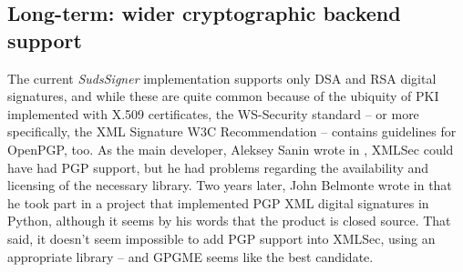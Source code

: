 \subsection{Long-term: wider cryptographic backend support}

The current \emph{SudsSigner} implementation supports only DSA and RSA digital signatures, and while these are quite common because of the ubiquity of PKI implemented with X.509 certificates, the WS\hyp{}Security standard -- or more specifically, the XML Signature W3C Recommendation -- contains guidelines for OpenPGP, too. As the main developer, Aleksey Sanin wrote in \cite{aleksey-pgp-mail}, XMLSec could have had PGP support, but he had problems regarding the availability and licensing of the necessary library. Two years later, John Belmonte wrote in \cite{belmonte-pgp-mail} that he took part in a project that implemented PGP XML digital signatures in Python, although it seems by his words that the product is closed source. That said, it doesn't seem impossible to add PGP support into XMLSec, using an appropriate library -- and GPGME \cite{gpgme-homepage} seems like the best candidate.
